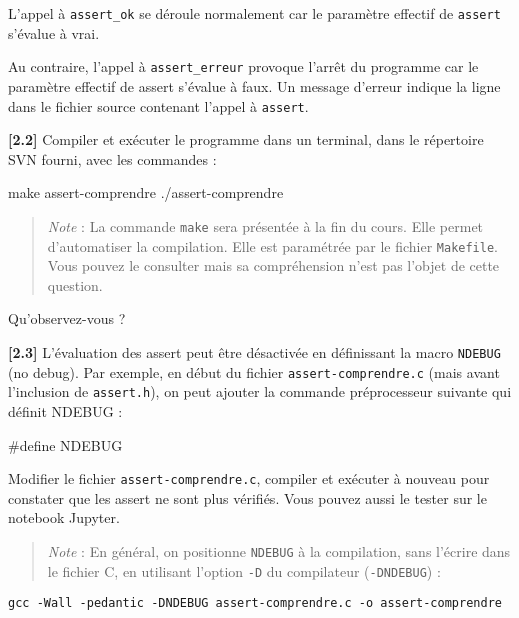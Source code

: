 \documentclass[11pt]{article}
\newenvironment{Shaded}{}{}
\newcommand{\NormalTok}[1]{{#1}}
\newcommand{\PreprocessorTok}[1]{\textcolor[rgb]{0.74,0.48,0.00}{{#1}}}
\begin{document}
    L'appel à \texttt{assert\_ok} se déroule normalement car le paramètre
effectif de \texttt{assert} s'évalue à vrai.

Au contraire, l'appel à \texttt{assert\_erreur} provoque l'arrêt du
programme car le paramètre effectif de assert s'évalue à faux. Un
message d'erreur indique la ligne dans le fichier source contenant
l'appel à \texttt{assert}.

\textbf{{[}2.2{]}} Compiler et exécuter le programme dans un terminal,
dans le répertoire SVN fourni, avec les commandes :

\begin{Shaded}
\begin{Highlighting}[]
\NormalTok{make assert{-}comprendre}
\NormalTok{./assert{-}comprendre}
\end{Highlighting}
\end{Shaded}

\begin{quote}
\emph{Note} : La commande \texttt{make} sera présentée à la fin du
cours. Elle permet d'automatiser la compilation. Elle est paramétrée par
le fichier \texttt{Makefile}. Vous pouvez le consulter mais sa
compréhension n'est pas l'objet de cette question.
\end{quote}

Qu'observez-vous ?

\textbf{{[}2.3{]}} L'évaluation des assert peut être désactivée en
définissant la macro \texttt{NDEBUG} (no debug). Par exemple, en début
du fichier \texttt{assert-comprendre.c} (mais avant l'inclusion de
\texttt{assert.h}), on peut ajouter la commande préprocesseur suivante
qui définit NDEBUG :

\begin{Shaded}
\begin{Highlighting}[]
\PreprocessorTok{\#define NDEBUG}
\end{Highlighting}
\end{Shaded}

Modifier le fichier \texttt{assert-comprendre.c}, compiler et exécuter à
nouveau pour constater que les assert ne sont plus vérifiés. Vous pouvez
aussi le tester sur le notebook Jupyter.

\begin{quote}
\emph{Note} : En général, on positionne \texttt{NDEBUG} à la
compilation, sans l'écrire dans le fichier C, en utilisant l'option
\texttt{-D} du compilateur (\texttt{-DNDEBUG}) :
\end{quote}

\begin{verbatim}
gcc -Wall -pedantic -DNDEBUG assert-comprendre.c -o assert-comprendre
\end{verbatim}
\end{document}
